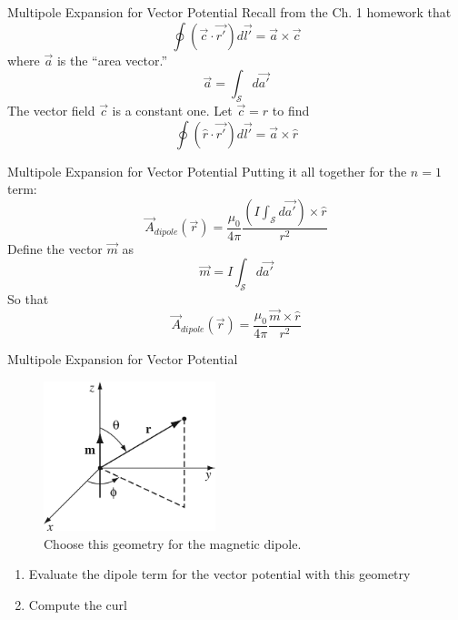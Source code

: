 \documentclass{beamer}
\begin{document}
\begin{frame}{Multipole Expansion for Vector Potential}
Recall from the Ch. 1 homework that
\begin{equation}
\oint (\vec{c} \cdot \vec{r'}) d\vec{l'} = \vec{a} \times \vec{c}
\end{equation}
where $\vec{a}$ is the ``area vector.''
\begin{equation}
\vec{a} = \int_{\mathcal{S}} d\vec{a'}
\end{equation}
The vector field $\vec{c}$ is a constant one.  Let $\vec{c} = \hat{r}$ to find
\begin{equation}
\oint (\hat{r} \cdot \vec{r'}) d\vec{l'} = \vec{a} \times \hat{r}
\end{equation}
\end{frame}

\begin{frame}{Multipole Expansion for Vector Potential}
Putting it all together for the $n = 1$ term:
\begin{equation}
\vec{A}_{dipole}(\vec{r}) = \frac{\mu_0}{4\pi} \frac{\left(I \int_{\mathcal{S}} d\vec{a'}\right) \times \hat{r}}{r^2}
\end{equation}
Define the vector $\vec{m}$ as
\begin{equation}
\vec{m} = I \int_{\mathcal{S}} d\vec{a'}
\end{equation}
So that
\begin{equation}
\boxed{
\vec{A}_{dipole}(\vec{r}) = \frac{\mu_0}{4\pi} \frac{\vec{m} \times \hat{r}}{r^2}
}
\end{equation}
\end{frame}

\begin{frame}{Multipole Expansion for Vector Potential}
\begin{figure}
\centering
\includegraphics[width=5cm]{figures/5_54.jpg}
\caption{\label{fig:mdip} Choose this geometry for the magnetic dipole.}
\end{figure}
\begin{enumerate}
\item Evaluate the dipole term for the vector potential with this geometry
\item Compute the curl
\end{enumerate}
\end{frame}
\end{document}
